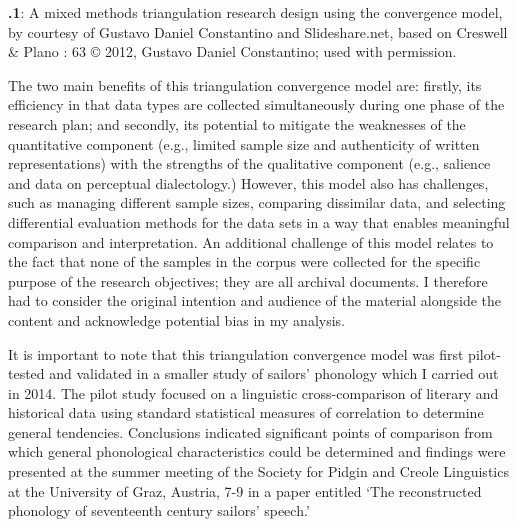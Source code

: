  
\begin{styleNormali}
\textbf{.1}: A mixed methods triangulation research design using the convergence model, by courtesy of Gustavo Daniel Constantino and Slideshare.net, based on Creswell \& Plano \citealt{Clark2007}: 63 © 2012, Gustavo Daniel Constantino; used with permission. 
\end{styleNormali}

\begin{styleNormali}
The two main benefits of this triangulation convergence model are: firstly, its efficiency in that data types are collected simultaneously during one phase of the research plan; and secondly, its potential to mitigate the weaknesses of the quantitative component (e.g., limited sample size and authenticity of written representations) with the strengths of the qualitative component (e.g., salience and data on perceptual dialectology.) However, this model also has challenges, such as managing different sample sizes, comparing dissimilar data, and selecting differential evaluation methods for the data sets in a way that enables meaningful comparison and interpretation. An additional challenge of this model relates to the fact that none of the samples in the corpus were collected for the specific purpose of the research objectives; they are all archival documents. I therefore had to consider the original intention and audience of the material alongside the content and acknowledge potential bias in my analysis. 
\end{styleNormali}

\begin{styleNormali}
It is important to note that this triangulation convergence model was first pilot-tested and validated in a smaller study of sailors’ phonology which I carried out in 2014. The pilot study focused on a linguistic cross-comparison of literary and historical data using standard statistical measures of correlation to determine general tendencies. Conclusions indicated significant points of comparison from which general phonological characteristics could be determined and findings were presented at the summer meeting of the Society for Pidgin and Creole Linguistics at the University of Graz, Austria, 7-9 \citealt{July2015} in a paper entitled ‘The reconstructed phonology of seventeenth century sailors’ speech.’
\end{styleNormali}

